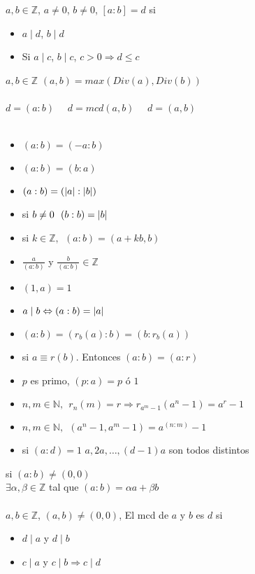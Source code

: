 \documentclass[a4paper,10pt]{article}
\begin{document}
 $a,b \in \mathbb{Z}$, $a \neq 0$, $b \neq 0$, $[a:b] = d$ si 
\begin{itemize}
	\item $a \mid d$, $b \mid d$
	\item Si $a \mid c$, $b \mid c$, $c > 0 \Rightarrow d \leq c$
\end{itemize}

 $a,b \in \mathbb{Z}$ $(a,b) = max \left( Div(a), Div(b) \right)$ \\ \\
\notacion $d = (a:b)$ \ \ $d = mcd(a,b)$ \ \ $d = (a,b)$ \\ \\
\propiedades
\begin{itemize}
	\item $(a:b) = (-a:b)$
	\item $(a:b) = (b:a)$
	\item $(a:b) = (\left\lvert a\right\rvert:\left\lvert b\right\rvert)$
	\item si $b \neq 0 \ \ (b:b) = \left\lvert b\right\rvert$
	\item si $k \in \mathbb{Z}, \ \ (a:b)=(a+kb,b)$
	\item $\frac{a}{(a:b)}$ y $\frac{b}{(a:b)} \in \mathbb{Z}$
	\item $(1,a) = 1$
	\item $a \mid b \Leftrightarrow (a:b) = \left\lvert a\right\rvert$
	\item $(a:b) = (r_{b}(a):b) = (b:r_{b}(a))$
	\item si $a \equiv r (b)$. Entonces $(a:b)=(a:r)$
	\item $p$ es primo, $(p:a)=p$ ó $1$
	\item $n,m \in \mathbb{N}, \ \ r_{n}(m) = r \Rightarrow r_{a^{m}-1}(a^{n}-1)=a^{r}-1$
	\item $n,m \in \mathbb{N}, \ \ (a^{n}-1,a^{m}-1)=a^{(n:m)}-1$
	\item si $(a:d)=1$  $a,2a,\dots,(d-1)a$ son todos distintos
\end{itemize}
\corolario si $(a:b) \neq (0,0)$ \\
$\exists \alpha, \beta \in \mathbb{Z}$ tal que $(a:b) = \alpha a + \beta b$ \\ \\
 $a,b \in \mathbb{Z}$, $(a,b) \neq (0,0)$, El mcd de $a$ y $b$ es $d$ si
\begin{itemize}
	\item $d \mid a$ y $d \mid b$
	\item $c \mid a$ y $c \mid b \Rightarrow c \mid d$
\end{itemize}
\end{document}
